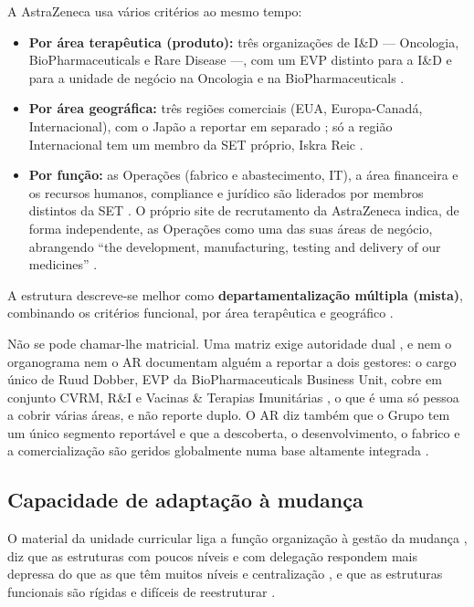 A AstraZeneca usa vários critérios ao mesmo tempo:

\begin{itemize}
\item \textbf{Por área terapêutica (produto):} três organizações de I\&D --- Oncologia, BioPharmaceuticals e Rare Disease \cite[p.~26]{AR} ---, com um EVP distinto para a I\&D e para a unidade de negócio na Oncologia e na BioPharmaceuticals \cite[p.~70]{AR}.
\item \textbf{Por área geográfica:} três regiões comerciais (EUA, Europa-Canadá, Internacional), com o Japão a reportar em separado \cite[p.~32]{AR}; só a região Internacional tem um membro da SET próprio, Iskra Reic \cite[p.~70]{AR}.
\item \textbf{Por função:} as Operações (fabrico e abastecimento, IT), a área financeira e os recursos humanos, compliance e jurídico são liderados por membros distintos da SET \cite[p.~70]{AR}. O próprio site de recrutamento da AstraZeneca indica, de forma independente, as Operações como uma das suas áreas de negócio, abrangendo ``the development, manufacturing, testing and delivery of our medicines'' \cite{CAREERS}.
\end{itemize}

\begin{analysis}
A estrutura descreve-se melhor como \textbf{departamentalização múltipla (mista)}, combinando os critérios funcional, por área terapêutica e geográfico \cite[p.~20]{ORG}.
\end{analysis}

\begin{sourceslimit}
Não se pode chamar-lhe matricial. Uma matriz exige autoridade dual \cite[pp.~21--22]{ORG}, e nem o organograma nem o AR documentam alguém a reportar a dois gestores: o cargo único de Ruud Dobber, EVP da BioPharmaceuticals Business Unit, cobre em conjunto CVRM, R\&I e Vacinas \& Terapias Imunitárias \cite[p.~70]{AR}, o que é uma só pessoa a cobrir várias áreas, e não reporte duplo. O AR diz também que o Grupo tem um único segmento reportável e que a descoberta, o desenvolvimento, o fabrico e a comercialização são geridos globalmente numa base altamente integrada \cite[p.~147]{AR}.
\end{sourceslimit}

\subsection{Capacidade de adaptação à mudança}

O material da unidade curricular liga a função organização à gestão da mudança \cite[pp.~4--5]{ORG}, diz que as estruturas com poucos níveis e com delegação respondem mais depressa do que as que têm muitos níveis e centralização \cite[p.~7]{ORG}, e que as estruturas funcionais são rígidas e difíceis de reestruturar \cite[p.~16]{ORG}.

